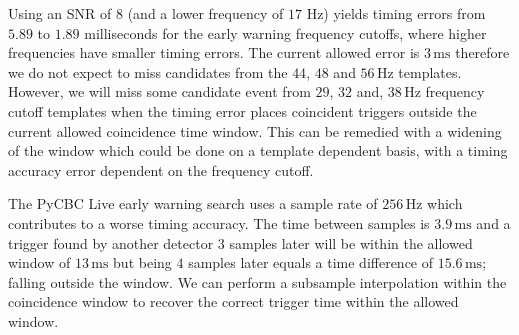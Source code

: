 %
Using an SNR of $8$ (and a lower frequency of $17$ Hz) yields timing errors from $5.89$ to $1.89$ milliseconds for the early warning frequency cutoffs, where higher frequencies have smaller timing errors. The current allowed error is $3 \, \text{ms}$ therefore we do not expect to miss candidates from the $44$, $48$ and $56 \, \text{Hz}$ templates. However, we will miss some candidate event from $29$, $32$ and, $38 \, \text{Hz}$ frequency cutoff templates when the timing error places coincident triggers outside the current allowed coincidence time window. This can be remedied with a widening of the window which could be done on a template dependent basis, with a timing accuracy error dependent on the frequency cutoff.

The PyCBC Live early warning search uses a sample rate of $256 \, \text{Hz}$ which contributes to a worse timing accuracy. The time between samples is $3.9 \, \text{ms}$ and a trigger found by another detector $3$ samples later will be within the allowed window of $13 \, \text{ms}$ but being $4$ samples later equals a time difference of $15.6  \, \text{ms}$; falling outside the window. We can perform a subsample interpolation within the coincidence window to recover the correct trigger time within the allowed window.

